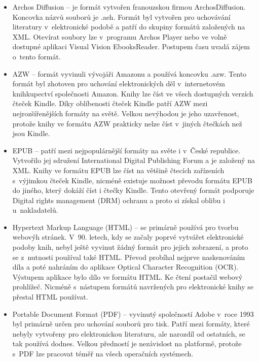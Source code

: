             \begin{itemize}
                \item Archos Diffusion – je formát vytvořen franouzskou firmou  ArchosDiffusion. Koncovka názvů souborů je .aeh. Formát byl vytvořen pro uchovávání literatury v~elektronické podobě a patří do skupiny formátů založených na XML. Otevírat soubory lze v~programu Archos Player nebo ve volně dostupné aplikaci Visual Vision EbooksReader. Postupem času uvadá zájem o~tento formát.
                
                \item AZW – formát vyvinuli vývojáři Amazonu a používá koncovku .azw. Tento formát byl zhotoven pro uchování elektronických děl v~internetovém knihkupectví společnosti Amazon. Knihy lze číst ve všech dostupných verzích čteček Kindle. Díky oblíbenosti čteček Kindle patří AZW mezi nejrozšířenějších formáty na světě. Velkou nevýhodou je jeho uzavřenost, protože knihy ve formátu AZW prakticky nelze číst v~jiných čtečkách než jsou Kindle.
                
                \item EPUB – patří mezi nejpopulárnější formáty na světe i v~České republice. Vytvořilo jej sdružení International Digital Publishing Forum a je založený na XML. Knihy ve formátu EPUB lze číst na většině čtecích zařízeních s~výjimkou čteček Kindle, nicméně existuje možnost převodu formátu EPUB do jiného, který dokáží číst i čtečky Kindle. Tento otevřený formát podporuje Digital rights management (DRM) ochranu a proto si získal oblibu i u~nakladatelů.
                
                \item Hypertext Markup Language (HTML) – se primárně používá pro tvorbu webovýh stránek. V~90. letech, kdy se začaly poprvé vytvářet elektronické podoby knih, nebyl ještě vyvinut žádný formát pro jejich zobrazení, a proto se z~nutnosti používal také HTML. Převod probíhal nejprve naskenováním díla a poté nahráním do aplikace Optical Character Recognition (OCR). Výstupem aplikace bylo dílo ve formátu HTML. Ke čtení postačil webový prohlížeč. Nicméně s~nástupem formátů navržených pro elektronické knihy se přestal HTML používat.
                
                \item Portable Document Format (PDF) – vyvinutý společností Adobe v~roce 1993 byl primárně určen pro uchování souborů pro tisk. Patří mezi formáty, které nebyly vytvořeny pro elektronickou literaturu, ale narozdíl od ostatních, se tak používá dodnes. Velkou předností je nezávislost na platformě, protože s~PDF lze pracovat téměř na všech operačních systémech. 
                

\end{itemize}
